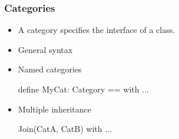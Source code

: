 \begin{comment}
\frametitle{Post-facto Extensions}
\begin{itemize}
\item Domains can later be extended to belong to a new category.
\item Demonstrate with \verb'Integer' in \verb'aldor -gloop' with
  libaldor and libalgebra.
aldor -gloop                     aldor -gloop
#include "aldor"                 #include "algebra"
#include "aldorinterp"           #include "aldorinterp"
Integer has Monoid               Integer has Monoid
Integer                          Integer
#quit                            #quit
\end{itemize}
\end{comment}





















\begin{frame}[fragile]
\frametitle{Categories}
\begin{itemize}
\item A category specifies the interface of a class.

\item General syntax

\item Named categories
\begin{myverbatim}
define MyCat: Category == with { ... }
\end{myverbatim}

\item Multiple inheritance
\begin{myverbatim}
Join(CatA, CatB) with { ... }
\end{myverbatim}
\end{itemize}
\end{frame}












